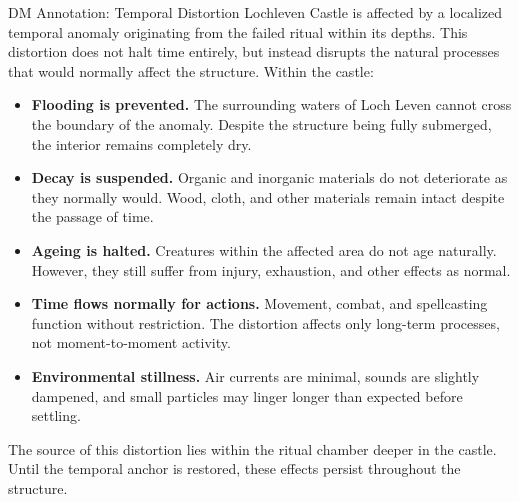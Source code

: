 	\begin{DndComment}{DM Annotation: Temporal Distortion}
		Lochleven Castle is affected by a localized temporal anomaly originating from the failed ritual within its depths. This distortion does not halt time entirely, but instead disrupts the natural processes that would normally affect the structure. Within the castle:
		\begin{itemize}
			\item \textbf{Flooding is prevented.} The surrounding waters of Loch Leven cannot cross the boundary of the anomaly. Despite the structure being fully submerged, the interior remains completely dry.
			\item \textbf{Decay is suspended.} Organic and inorganic materials do not deteriorate as they normally would. Wood, cloth, and other materials remain intact despite the passage of time.
			\item \textbf{Ageing is halted.} Creatures within the affected area do not age naturally. However, they still suffer from injury, exhaustion, and other effects as normal.
			\item \textbf{Time flows normally for actions.} Movement, combat, and spellcasting function without restriction. The distortion affects only long-term processes, not moment-to-moment activity.
			\item \textbf{Environmental stillness.} Air currents are minimal, sounds are slightly dampened, and small particles may linger longer than expected before settling.
		\end{itemize}
		\noindent The source of this distortion lies within the ritual chamber deeper in the castle. Until the temporal anchor is restored, these effects persist throughout the structure.
	\end{DndComment}
\endgroup

